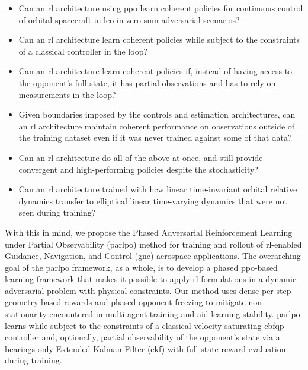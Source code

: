\begin{itemize}
    \item Can an \acs{rl} architecture using \acs{ppo} learn coherent policies for continuous control of orbital spacecraft in \acs{leo} in zero-sum adversarial scenarios?
    \item Can an \acs{rl} architecture learn coherent policies while subject to the constraints of a classical controller in the loop?
    \item Can an \acs{rl} architecture learn coherent policies if, instead of having access to the opponent's full state, it has partial observations and has to rely on measurements in the loop?
    \item Given boundaries imposed by the controls and estimation architectures, can an \acs{rl} architecture maintain coherent performance on observations outside of the training dataset even if it was never trained against some of that data?
    \item Can an \acs{rl} architecture do all of the above at once, and still provide convergent and high-performing policies despite the stochasticity?
    \item Can an \acs{rl} architecture trained with \acs{hcw} linear time-invariant orbital relative dynamics transfer to elliptical linear time-varying dynamics that were not seen during training?
\end{itemize}


With this in mind, we propose the Phased Adversarial Reinforcement Learning under Partial Observability (\acs{parlpo}) method for training and rollout of \acs{rl}-enabled Guidance, Navigation, and Control (\acs{gnc}) aerospace applications. The overarching goal of the \acs{parlpo} framework, as a whole, is to develop a phased \acs{ppo}-based learning framework that makes it possible to apply \acs{rl} formulations in a dynamic adversarial problem with physical constraints. Our method uses dense per-step geometry-based rewards and phased opponent freezing to mitigate non-stationarity encountered in multi-agent training and aid learning stability. \acs{parlpo} learns while subject to the constraints of a classical velocity-saturating \acs{cbfqp} controller and, optionally, partial observability of the opponent's state via a bearings-only Extended Kalman Filter (\acs{ekf}) with full-state reward evaluation during training.


